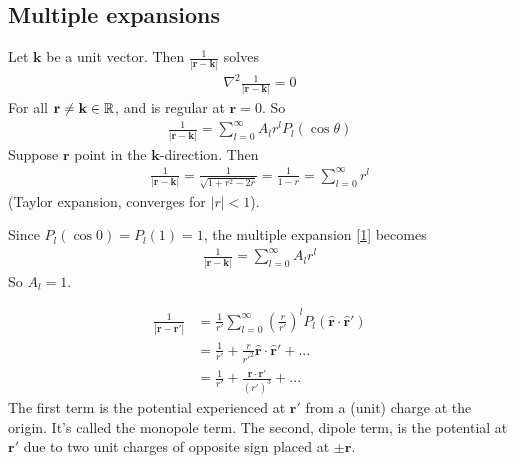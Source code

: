 \documentclass[a4paper]{article}
\begin{document}
\subsection{Multiple expansions}
Let $\mathbf{k}$ be a unit vector. Then $\frac{1}{|\mathbf{r}-\mathbf{k}|}$ solves
\begin{equation*}
\begin{aligned}
\nabla^2 \frac{1}{|\mathbf{r}-\mathbf{k}|} = 0
\end{aligned}
\end{equation*}
For all $\mathbf{r} \neq \mathbf{k} \in \mathbb{R}$, and is regular at $\mathbf{r}=0$. So
\begin{equation}\label{1}
\begin{aligned}
\frac{1}{|\mathbf{r}-\mathbf{k}|} = \sum_{l=0}^\infty A_l r^l P_l\left(\cos\theta\right)
\end{aligned}
\end{equation}
Suppose $\mathbf{r}$ point in the $\mathbf{k}$-direction. Then
\begin{equation*}
\begin{aligned}
\frac{1}{|\mathbf{r}-\mathbf{k}|} = \frac{1}{\sqrt{1+r^2-2r}} = \frac{1}{1-r} = \sum_{l=0}^\infty r^l
\end{aligned}
\end{equation*}
(Taylor expansion, converges for $|r|<1$).

Since $P_l\left(\cos 0\right) = P_l\left(1\right) = 1$, the multiple expansion \eqref{1} becomes
\begin{equation*}
\begin{aligned}
\frac{1}{|\mathbf{r}-\mathbf{k}|} = \sum_{l=0}^\infty A_l r^l
\end{aligned}
\end{equation*}
So $A_l=1$.

\begin{equation*}
\begin{aligned}
\frac{1}{|\mathbf{r}-\mathbf{r}'|} &= \frac{1}{r'} \sum_{l=0}^\infty \left(\frac{r}{r'}\right)^l P_l\left(\hat{\mathbf{r}} \cdot \hat{\mathbf{r}}'\right)\\
&= \frac{1}{r'} + \frac{r}{r'^2} \hat{\mathbf{r}}\cdot\hat{\mathbf{r}}' + ...\\
&= \frac{1}{r'} + \frac{\mathbf{r}\cdot\mathbf{r}'}{\left(r'\right)^3} + ...
\end{aligned}
\end{equation*}
The first term is the potential experienced at $\mathbf{r}'$ from a (unit) charge at the origin. It's called the monopole term. The second, dipole term, is the potential at $\mathbf{r}'$ due to two unit charges of opposite sign placed at $\pm \mathbf{r}$.
\end{document}
